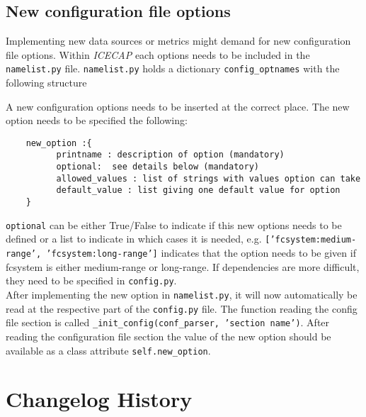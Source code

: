 \documentclass[DIV=10, parskip=full]{scrreprt}
\newcommand{\ice}{\textit{ICECAP}\xspace}
\begin{document}
\section{New configuration file options}
Implementing new data sources or metrics might demand for new configuration file options. Within \ice each options needs to be included in the \texttt{namelist.py} file.   \texttt{namelist.py} holds a dictionary \texttt{config\_optnames} with the following structure\\


A new configuration options needs to be inserted at the correct place. The new option needs to be specified the following:\\
\begin{verbatim}
	new_option :{
	      printname : description of option (mandatory)
	      optional:  see details below (mandatory)
	      allowed_values : list of strings with values option can take
	      default_value : list giving one default value for option
	}
\end{verbatim}

\texttt{optional} can be either True/False to indicate if this new options needs to be defined or a list to indicate in which cases it is needed, e.g. \texttt{['fcsystem:medium-range', 'fcsystem:long-range']} indicates that the option needs to be given if fcsystem is either medium-range or long-range. If dependencies are more difficult, they need to be specified in \texttt{config.py}.\\

After implementing the new option in \texttt{namelist.py}, it will now automatically be read at the respective part of the \texttt{config.py} file. The function reading the config file section is called \texttt{\_init\_config(conf\_parser, 'section name')}. After reading the configuration file section the value of the new option should be available as a class attribute \texttt{self.new\_option}.

\chapter{Changelog History}
\end{document}
